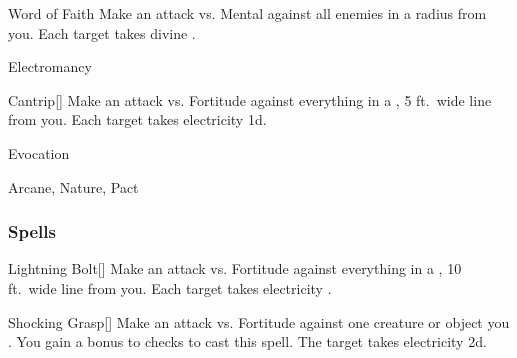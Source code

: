 \lowercase{\hypertarget{spell:Word of Faith}{}}\label{spell:Word of Faith}
\begin{ability}[\nth{2}]{\hypertarget{spell:Word of Faith}{Word of Faith}}
Make an attack vs. Mental against all enemies in a \areamed radius from you.
\hit Each target takes divine .
\end{ability}
\vspace{0.25em}


\newpage
\begin{spellsection}{Electromancy}

\begin{spellheader}
\end{spellheader}


\begin{ability}{Cantrip}[]
Make an attack vs. Fortitude against everything in a \areamed, 5 ft.\ wide line from you.
\hit Each target takes electricity  \minus1d.
\end{ability}




 Evocation

 Arcane, Nature, Pact
\end{spellsection}


\subsubsection{Spells}


\lowercase{\hypertarget{spell:Lightning Bolt}{}}\label{spell:Lightning Bolt}
\begin{ability}[\nth{1}]{\hypertarget{spell:Lightning Bolt}{Lightning Bolt}}[]
Make an attack vs. Fortitude against everything in a \arealarge, 10 ft.\ wide line from you.
\hit Each target takes electricity .
\end{ability}
\vspace{0.25em}



\lowercase{\hypertarget{spell:Shocking Grasp}{}}\label{spell:Shocking Grasp}
\begin{ability}[\nth{1}]{\hypertarget{spell:Shocking Grasp}{Shocking Grasp}}[]
Make an attack vs. Fortitude against one creature or object you .
You gain a  bonus to  checks to cast this spell.
\hit The target takes electricity  \plus2d.
\end{ability}
\vspace{0.25em}



